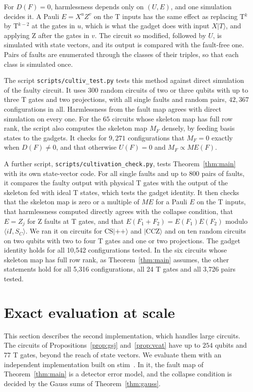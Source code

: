 \documentclass[aps,prl,reprint,twocolumn,amsmath,amssymb,floatfix,nofootinbib,superscriptaddress]{revtex4-2}
\theoremstyle{definition}
\theoremstyle{remark}
\newcommand{\CCZ}{\mathrm{CCZ}}
\newcommand{\CS}{\mathrm{CS}}
\begin{document}
For $D(F)=0$, harmlessness depends only on $(U,E)$, and one simulation decides it. A Pauli $E=X^uZ^v$ on the T inputs has the same effect as replacing T$^{k}$ by T$^{k-2}$ at the gates in $u$, which is what the gadget does with input $X|T\rangle$, and applying Z after the gates in $v$. The circuit so modified, followed by $U$, is simulated with state vectors, and its output is compared with the fault-free one. Pairs of faults are enumerated through the classes of their triples, so that each class is simulated once.

The script \texttt{scripts/cultiv\_test.py} tests this method against direct simulation of the faulty circuit. It uses $300$ random circuits of two or three qubits with up to three T gates and two projections, with all single faults and random pairs, $42{,}367$ configurations in all. Harmlessness from the fault map agrees with direct simulation on every one. For the $65$ circuits whose skeleton map has full row rank, the script also computes the skeleton map $M_F$ densely, by feeding basis states to the gadgets. It checks for $9{,}271$ configurations that $M_F=0$ exactly when $D(F)\neq0$, and that otherwise $U(F)=0$ and $M_F\propto ME(F)$.

A further script, \texttt{scripts/cultivation\_check.py}, tests Theorem~\ref{thm:main} with its own state-vector code. For all single faults and up to 800 pairs of faults, it compares the faulty output with physical T gates with the output of the skeleton fed with ideal T states, which tests the gadget identity. It then checks that the skeleton map is zero or a multiple of $ME$ for a Pauli $E$ on the T inputs, that harmlessness computed directly agrees with the collapse condition, that $E=Z_j$ for Z faults at T gates, and that $E(F_1+F_2)=E(F_1)E(F_2)$ modulo $\langle iI,S_C\rangle$. We ran it on circuits for $\CS|{+}{+}\rangle$ and $|\CCZ\rangle$ and on ten random circuits on two qubits with two to four T gates and one or two projections. The gadget identity holds for all 10{,}542 configurations tested. In the six circuits whose skeleton map has full row rank, as Theorem~\ref{thm:main} assumes, the other statements hold for all 5{,}316 configurations, all 24 T gates and all 3{,}726 pairs tested.

\section{Exact evaluation at scale}\label{sm:algorithm}
This section describes the second implementation, which handles large circuits. The circuits of Propositions~\ref{prop:gsj} and~\ref{prop:vcat} have up to $254$ qubits and $77$ T gates, beyond the reach of state vectors. We evaluate them with an independent implementation built on stim~\cite{stim}. In it, the fault map of Theorem~\ref{thm:main} is a detector error model, and the collapse condition is decided by the Gauss sums of Theorem~\ref{thm:gauss}.
\end{document}
